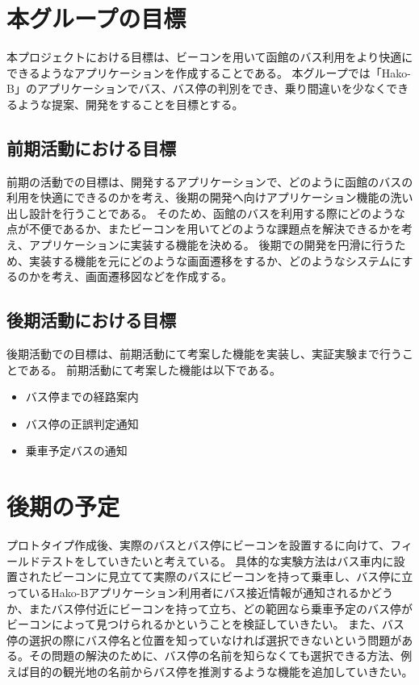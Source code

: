 \documentclass[openany,11pt,papersize]{jsbook}
\begin{document}
\section{本グループの目標}
本プロジェクトにおける目標は、ビーコンを用いて函館のバス利用をより快適にできるようなアプリケーションを作成することである。
本グループでは「Hako-B」のアプリケーションでバス、バス停の判別をでき、乗り間違いを少なくできるような提案、開発をすることを目標とする。


\subsection{前期活動における目標}
前期の活動での目標は、開発するアプリケーションで、どのように函館のバスの利用を快適にできるのかを考え、後期の開発へ向けアプリケーション機能の洗い出し設計を行うことである。
そのため、函館のバスを利用する際にどのような点が不便であるか、またビーコンを用いてどのような課題点を解決できるかを考え、アプリケーションに実装する機能を決める。
後期での開発を円滑に行うため、実装する機能を元にどのような画面遷移をするか、どのようなシステムにするのかを考え、画面遷移図などを作成する。


\subsection{後期活動における目標}
後期活動での目標は、前期活動にて考案した機能を実装し、実証実験まで行うことである。
前期活動にて考案した機能は以下である。
\begin{itemize}

\item バス停までの経路案内
\item バス停の正誤判定通知
\item 乗車予定バスの通知

\end{itemize}


\section{後期の予定}

プロトタイプ作成後、実際のバスとバス停にビーコンを設置するに向けて、フィールドテストをしていきたいと考えている。
具体的な実験方法はバス車内に設置されたビーコンに見立てて実際のバスにビーコンを持って乗車し、バス停に立っているHako-Bアプリケーション利用者にバス接近情報が通知されるかどうか、またバス停付近にビーコンを持って立ち、どの範囲なら乗車予定のバス停がビーコンによって見つけられるかということを検証していきたい。
また、バス停の選択の際にバス停名と位置を知っていなければ選択できないという問題がある。その問題の解決のために、バス停の名前を知らなくても選択できる方法、例えば目的の観光地の名前からバス停を推測するような機能を追加していきたい。
\end{document}
